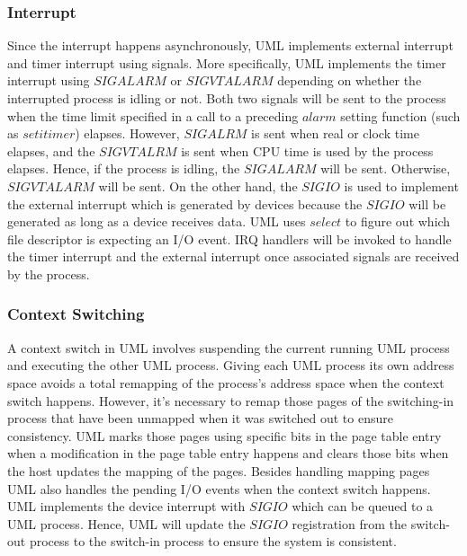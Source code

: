 \subsubsection{Interrupt}


Since the interrupt happens asynchronously, UML implements external interrupt and timer interrupt using signals. More specifically, UML implements the timer interrupt using $SIGALARM$ or $SIGVTALARM$ depending on whether the interrupted process is idling or not. Both two signals will be sent to the process when the time limit specified in a call to a preceding $alarm$ setting function (such as $setitimer$) elapses. However, $SIGALRM$ is sent when real or clock time elapses, and the $SIGVTALRM$ is sent when CPU time is used by the process elapses. Hence, if the process is idling, the $SIGALARM$ will be sent. Otherwise, $SIGVTALARM$ will be sent. On the other hand, the $SIGIO$ is used to implement the external interrupt which is generated by devices because the $SIGIO$ will be generated as long as a device receives data. UML uses $select$ to figure out which file descriptor is expecting an I/O event. IRQ handlers will be invoked to handle the timer interrupt and the external interrupt once associated signals are received by the process.

\subsubsection{Context Switching}


A context switch in UML involves suspending the current running UML process and executing the other UML process. Giving each UML process its own address space avoids a total remapping of the process's address space when the context switch happens. However, it's necessary to remap those pages of the switching-in process that have been unmapped when it was switched out to ensure consistency. UML marks those pages using specific bits in the page table entry when a modification in the page table entry happens and clears those bits when the host updates the mapping of the pages. Besides handling mapping pages UML also handles the pending I/O events when the context switch happens. UML implements the device interrupt with $SIGIO$ which can be queued to a UML process. Hence, UML will update the $SIGIO$ registration from the switch-out process to the switch-in process to ensure the system is consistent.        

